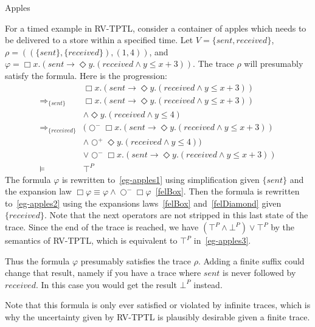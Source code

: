 \documentclass[a4paper]{article}
\newcommand{\sn}{\bigcirc^+}
\newcommand{\wn}{\bigcirc^-}
\newcommand{\rw}[1]{\Rightarrow_{#1}}
\begin{document}
\begin{eg}{Apples}

  For a timed example in RV-TPTL, consider a container of apples which needs to be delivered to a store within a specified time.
  Let $V=\{sent, received\}$,
  \(\rho=((\{sent\},\{received\}),(1,4))\),
  and \(\varphi=\Box x. (sent \to \Diamond y. (received \land y \leq x + 3))\).
  The trace $\rho$ will presumably satisfy the formula.
  Here is the progression:
  \begin{align}
    &\Box x. (sent \to \Diamond y. (received \land y \leq x + 3))\nonumber\\
    \rw{\{sent\}}
    &\Box x. (sent \to \Diamond y. (received \land y \leq x + 3))\nonumber\\
    &\land \Diamond y. (received \land y \leq 4)
    \label{eg-apples1}\\
    \rw{\{received\}}
    &(\wn \Box x. (sent \to \Diamond y. (received \land y \leq x + 3))\nonumber\\
    &\land \sn \Diamond y. (received \land y \leq 4))\nonumber\\
    &\lor \wn \Box x. (sent \to \Diamond y. (received \land y \leq x + 3))\label{eg-apples2}\\
    \vDash
    &\top^P\label{eg-apples3}
  \end{align}
  The formula $\varphi$ is rewritten to~\eqref{eg-apples1} using simplification given $\{sent\}$ and the expansion law $\Box \varphi \equiv \varphi \land \wn \Box \varphi$~\eqref{felBox}.
  Then the formula is rewritten to~\eqref{eg-apples2} using the expansions laws~\eqref{felBox} and~\eqref{felDiamond} given $\{received\}$.
  Note that the next operators are not stripped in this last state of the trace.
  Since the end of the trace is reached, we have $(\top^P \land \bot^P) \lor \top^P$ by the semantics of RV-TPTL, which is equivalent to $\top^P$ in~\eqref{eg-apples3}.

  Thus the formula $\varphi$ presumably satisfies the trace $\rho$.
  Adding a finite suffix could change that result, namely if you have a trace where $sent$ is never followed by $received$.
  In this case you would get the result $\bot^P$ instead.

  Note that this formula is only ever satisfied or violated by infinite traces, which is why the uncertainty given by RV-TPTL is plausibly desirable given a finite trace.
\end{eg}

\end{document}
